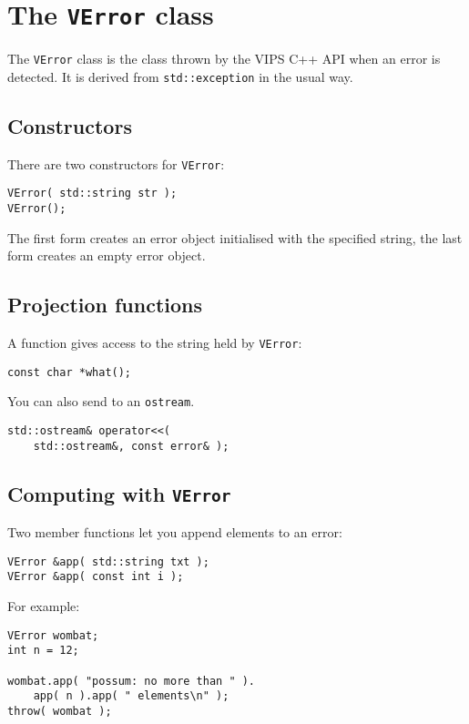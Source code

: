 \section{The \texttt{VError} class}

The \verb+VError+ class is the class thrown by the VIPS C++ API when an
error is detected. It is derived from \verb+std::exception+ in the usual way.

\subsection{Constructors}

There are two constructors for \verb+VError+:

\begin{verbatim}
VError( std::string str );
VError();
\end{verbatim}

The first form creates an error object initialised with the specified
string, the last form creates an empty error object.

\subsection{Projection functions}

A function gives access to the string held by \verb+VError+:

\begin{verbatim}
const char *what();
\end{verbatim}

You can also send to an \verb+ostream+.

\begin{verbatim}
std::ostream& operator<<( 
    std::ostream&, const error& );
\end{verbatim}

\subsection{Computing with \texttt{VError}}

Two member functions let you append elements to an error:

\begin{verbatim}
VError &app( std::string txt );
VError &app( const int i );
\end{verbatim}

For example:

\begin{verbatim}
VError wombat;
int n = 12;

wombat.app( "possum: no more than " ).
	app( n ).app( " elements\n" );
throw( wombat );
\end{verbatim}

